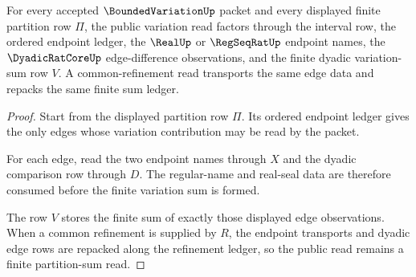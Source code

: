 \begin{theorem}
\label{thm:bounded-variation-variation-ledger-exactness}
For every accepted $\BoundedVariationUp$ packet and every displayed finite partition row $\Pi$, the public variation read factors through the interval row, the ordered endpoint ledger, the $\RealUp$ or $\RegSeqRatUp$ endpoint names, the $\DyadicRatCoreUp$ edge-difference observations, and the finite dyadic variation-sum row $V$. A common-refinement read transports the same edge data and repacks the same finite sum ledger.
\end{theorem}
\begin{proof}
Start from the displayed partition row $\Pi$. Its ordered endpoint ledger gives the only edges whose variation contribution may be read by the packet.

For each edge, read the two endpoint names through $X$ and the dyadic comparison row through $D$. The regular-name and real-seal data are therefore consumed before the finite variation sum is formed.

The row $V$ stores the finite sum of exactly those displayed edge observations. When a common refinement is supplied by $R$, the endpoint transports and dyadic edge rows are repacked along the refinement ledger, so the public read remains a finite partition-sum read.
\end{proof}

